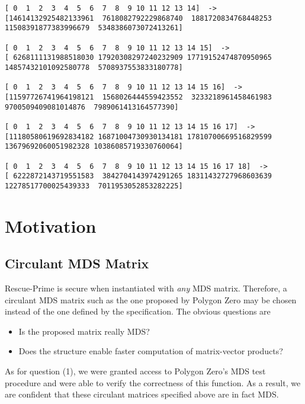 \documentclass[a4paper]{article}
\begin{document}
\begin{lstlisting}
[ 0  1  2  3  4  5  6  7  8  9 10 11 12 13 14]  -> 
[14614132925482133961  7618082792229868740  1881720834768448253 11508391877383996679  5348386073072413261]

[ 0  1  2  3  4  5  6  7  8  9 10 11 12 13 14 15]  -> 
[ 6268111131988518030 17920308297240232909 17719152474870950965 14857432101092580778  5708937553833180778]

[ 0  1  2  3  4  5  6  7  8  9 10 11 12 13 14 15 16]  -> 
[11597726741964198121  1568026444559423552  3233218961458461983  9700509409081014876  7989061413164577390]

[ 0  1  2  3  4  5  6  7  8  9 10 11 12 13 14 15 16 17]  -> 
[11180580619692834182 16871004730930134181 17810700669516829599 13679692060051982328 10386085719330760064]

[ 0  1  2  3  4  5  6  7  8  9 10 11 12 13 14 15 16 17 18]  -> 
[ 6222872143719551583  3842704143974291265 18311432727968603639 12278517700025439333  7011953052853282225]
\end{lstlisting}

\section{Motivation}

\subsection{Circulant MDS Matrix}

Rescue-Prime is secure when instantiated with \emph{any} MDS matrix. Therefore, a circulant MDS matrix such as the one proposed by Polygon Zero may be chosen instead of the one defined by the specification. The obvious questions are
\begin{itemize}
\item[1)] Is the proposed matrix really MDS?
\item[2)] Does the structure enable faster computation of matrix-vector products?
\end{itemize}

As for question (1), we were granted access to Polygon Zero's MDS test procedure and were able to verify the correctness of this function. As a result, we are confident that these circulant matrices specified above are in fact MDS. 
\end{document}
